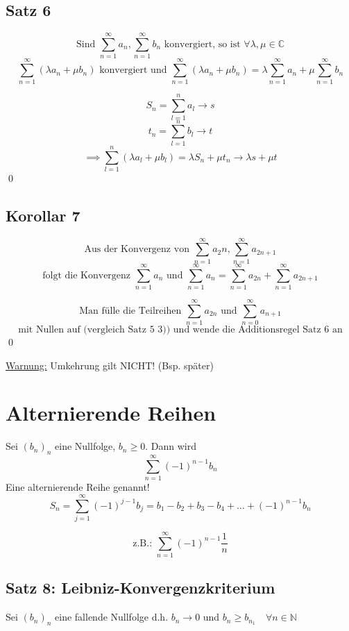 \documentclass[fleqn]{scrbook}
\newcommand{\N}{\mathbb{N}}
\newcommand{\sumNI}{\sum_{n=0}^{\infty}}
\newcommand{\sumOI}{\sum_{n=1}^{\infty}}
\renewenvironment{proof}{{\bfseries Beweis }}{\qed}
\begin{document}
\subsection{Satz 6}

\[\text{Sind } \sumOI a_n, \sumOI b_n \text{  konvergiert, so ist } \forall \lambda, \mu \in \mathbb{C}\]
\[\sumOI (\lambda a_n + \mu b_n) \text{ konvergiert  und } \sumOI (\lambda a_n + \mu b_n) = \lambda \sumOI a_n + \mu \sumOI b_n \]

\begin{proof}
  \[S_n = \sum_{l=1}^n a_l \to s\]
  \[t_n = \sum_{l=1}^n b_l \to t\]
  \[\implies \sum_{l=1}^n (\lambda a_l + \mu b_l) = \lambda S_n + \mu t_n \to \lambda s + \mu t\]
\end{proof}

\subsection{Korollar 7}

\[\text{Aus der Konvergenz von } \sumOI a_2n, \sumOI a_{2n+1}\]
\[\text{folgt die Konvergenz } \sumOI a_n
\text{ und } \sumOI a_n = \sumOI a_{2n} + \sumOI a_{2n+1}\]

\begin{proof}
  \[\text{Man fülle die Teilreihen } \sumOI a_{2n} \text{ und } \sumNI a_{n+1}\]
  \[\text{mit Nullen auf (vergleich Satz 5 3)) und wende die Additionsregel Satz 6 an}\] 
\end{proof}

\underline{Warnung:} Umkehrung gilt NICHT! (Bsp. später)

\section{Alternierende Reihen}

Sei $(b_n)_n$ eine Nullfolge, $b_n \geq 0$. Dann wird
\[\sumOI (-1)^{n-1} b_n\]
Eine alternierende Reihe genannt!
\[S_n = \sum_{j=1}^\infty (-1)^{j-1} b_j = b_1-b_2+b_3-b_4+\ldots+(-1)^{n-1} b_n\]

\[\text{z.B.: } \sumOI (-1)^{n-1} \frac{1}{n}\]

\subsection{Satz 8: Leibniz-Konvergenzkriterium}

Sei $(b_n)_n$ eine fallende Nullfolge d.h. $b_n \to 0$ und $b_n \geq b_{n_1} \quad \forall n \in \N$ 
\end{document}
